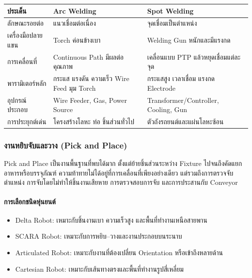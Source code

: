 \begin{table}[htbp]
    \centering
    \begin{tabular}{l l l}
        \hline
        \textbf{ประเด็น} & \textbf{Arc Welding} & \textbf{Spot Welding} \\
        \hline
        ลักษณะรอยต่อ & แนวเชื่อมต่อเนื่อง & จุดเชื่อมเป็นตำแหน่ง \\
        เครื่องมือปลายแขน & Torch ค่อนข้างเบา & Welding Gun หนักและมีแรงกด \\
        การเคลื่อนที่ & Continuous Path มีผลต่อคุณภาพ & เคลื่อนแบบ PTP แล้วหยุดเชื่อมแต่ละจุด \\
        พารามิเตอร์หลัก & กระแส แรงดัน ความเร็ว Wire Feed มุม Torch & กระแสสูง เวลาเชื่อม แรงกด Electrode \\
        อุปกรณ์ประกอบ & Wire Feeder, Gas, Power Source & Transformer/Controller, Cooling, Gun \\
        การประยุกต์เด่น & โครงสร้างโลหะ ท่อ ชิ้นส่วนทั่วไป & ตัวถังรถยนต์และแผ่นโลหะซ้อน \\
        \hline
    \end{tabular}
\end{table}

\subsubsection{งานหยิบจับและวาง (Pick and Place)}

Pick and Place เป็นงานพื้นฐานที่พบได้มาก ตั้งแต่ย้ายชิ้นส่วนระหว่าง Fixture ไปจนถึงคัดแยกอาหารหรือบรรจุภัณฑ์ ความท้าทายไม่ได้อยู่ที่การเคลื่อนที่เพียงอย่างเดียว แต่รวมถึงการตรวจจับตำแหน่ง การจับโดยไม่ทำให้ชิ้นงานเสียหาย การตรวจสอบการจับ และการประสานกับ Conveyor

\paragraph{การเลือกชนิดหุ่นยนต์}

\begin{itemize}
    \item Delta Robot: เหมาะกับชิ้นงานเบา ความเร็วสูง และพื้นที่ทำงานเหนือสายพาน
    \item SCARA Robot: เหมาะกับการหยิบ–วางและงานประกอบบนระนาบ
    \item Articulated Robot: เหมาะกับงานที่ต้องเปลี่ยน Orientation หรือเข้าถึงหลายด้าน
    \item Cartesian Robot: เหมาะกับเส้นทางตรงและพื้นที่ทำงานรูปสี่เหลี่ยม
\end{itemize}

